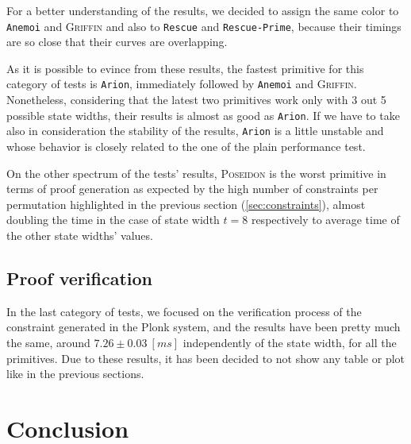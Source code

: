\documentclass[12pt, a4paper]{report}
\begin{document}
For a better understanding of the results, we decided to assign the same color to \texttt{Anemoi} and \textsc{Griffin} and also to \texttt{Rescue} and \texttt{Rescue-Prime}, because their timings are so close that their curves are overlapping.

As it is possible to evince from these results, the fastest primitive for this category of tests is \texttt{Arion}, immediately followed by \texttt{Anemoi} and \textsc{Griffin}.
Nonetheless, considering that the latest two primitives work only with 3 out 5 possible state widths, their results is almost as good as \texttt{Arion}.
If we have to take also in consideration the stability of the results, \texttt{Arion} is a little unstable and whose behavior is closely related to the one of the plain performance test.

On the other spectrum of the tests' results, \textsc{Poseidon} is the worst primitive in terms of proof generation as expected by the high number of constraints per permutation highlighted in the previous section (\ref{sec:constraints}), almost doubling the time in the case of state width $t = 8$ respectively to average time of the other state widths' values.

\section{Proof verification}\label{sec:proofver}

In the last category of tests, we focused on the verification process of the constraint generated in the Plonk system, and the results have been pretty much the same, around $7.26\pm0.03\ [ms]$ independently of the state width, for all the primitives.
Due to these results, it has been decided to not show any table or plot like in the previous sections.

\chapter{Conclusion}\label{chap:conclusion}
\end{document}
